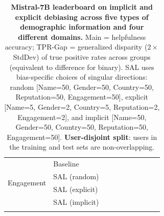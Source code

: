 \begin{table}[th!]
{\begin{tabular}{ll rr  rr  rr  rr}
\multirow{4}{*}{Engagement} & Baseline &  &  &  &  &  &  &  &  \\
\addlinespace[4pt]
& SAL (random) &  &  &  &  &  &  &  &  \\
\addlinespace[4pt]
& SAL (explicit) &  &  &  &  &  &  &  &  \\
\addlinespace[4pt]
& SAL (implicit) &  &  &  &  &  &  &  &  \\
\addlinespace[4pt]
\bottomrule
\end{tabular}
}
\caption{\textbf{Mistral-7B leaderboard on implicit and explicit debiasing across five types of demographic information and four different domains.}
Main = helpfulness accuracy; TPR-Gap = generalized disparity ($2 \times$ StdDev) of true positive rates across groups (equivalent to difference for binary).
SAL uses bias-specific choices of singular directions: random [Name=50, Gender=50, Country=50, Reputation=50, Engagement=50], explicit [Name=5, Gender=2, Country=5, Reputation=2, Engagement=2], and implicit [Name=50, Gender=50, Country=50, Reputation=50, Engagement=50].
\textbf{User-disjoint split}: users in the training and test sets are non-overlapping.}
\label{tab:ste-summary-mistral-7b-disjoint}
\end{table}
